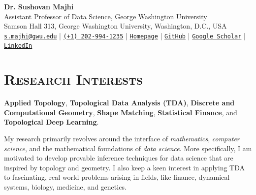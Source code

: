 \documentclass[11pt]{article}
\begin{document}

%
\pagestyle{empty} %

\begin{center}
\textbf{\Large Dr. Sushovan Majhi}\\
Assistant Professor of Data Science, George Washington University\\
Samson Hall 313, George Washington University, Washington, D.C., USA\\
\href{mailto:s.majhi@gwu.edu}{\tt s.majhi@gwu.edu} |
\href{tel:+12029941235}{\tt (+1) 202-994-1235} |
\href{https://www.smajhi.com}{\tt Homepage} |
\href{https://www.github.com/sushovan4}{\tt GitHub} |
\href{https://scholar.google.com/citations?user=3zP2QQsAAAAJ&hl=en&oi=sra}
{\tt Google Scholar} |
\href{https://www.linkedin.com/in/smajhi/}{\tt LinkedIn}
\end{center}
\section{\textsc{Research Interests}} \textbf{Applied Topology}, 
\textbf{Topological Data Analysis (TDA)},
\textbf{Discrete and Computational Geometry}, \textbf{Shape Matching}, \textbf{Statistical Finance}, and \textbf{Topological Deep Learning}.

My research primarily revolves around the interface of
\emph{mathematics}, \emph{computer science}, and the mathematical foundations of \emph{data science}. 
More specifically, I am motivated to develop provable inference techniques for data science that are inspired by topology and geometry. I also keep a keen interest in applying TDA to fascinating, real-world problems arising in fields, like finance,  dynamical systems, biology, medicine, and genetics. \\
\end{document}
